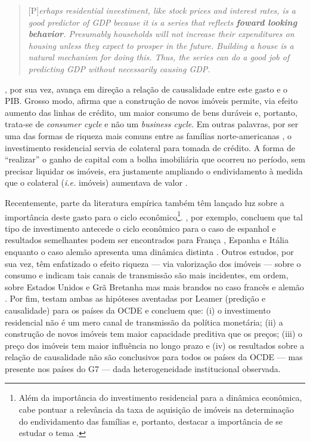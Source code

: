 \begin{quote}
	
	[P]\textit{erhaps residential investiment, like stock prices and interest rates, is a good predictor of GDP because it is a series that reflects \textbf{foward looking behavior}. Presumably households will not increase their expenditures on housing unless they expect to prosper in the future. Building a house is a natural mechanism for doing this. Thus, the series can do a good job of predicting GDP without necessarily causing GDP.}
	\cite[p.~267, grifos adicionados]{green_follow_1997}
\end{quote}
\textcite{leamer_housing_2007}, por sua vez, avança em direção a relação de causalidade entre este gasto e o PIB. Grosso modo, afirma que a construção de novos imóveis permite, via efeito aumento das linhas de crédito, um maior consumo de bens duráveis e, portanto, trata-se de \textit{consumer cycle} e não um \textit{business cycle}. Em outras palavras, por ser  uma das formas de riqueza mais comuns entre as famílias norte-americanas \cite{teixeira_uma_2011}, o investimento residencial servia de colateral para tomada de crédito. A forma de ``realizar'' o ganho de capital com a bolha imobiliária que ocorreu no período, sem precisar liquidar os imóveis, era justamente ampliando o endividamento à medida que o colateral (\textit{i.e.} imóveis) aumentava de valor \cite{teixeira_crescimento_2015}. 

Recentemente, parte da literatura empírica também têm lançado luz sobre a importância deste gasto para o ciclo econômico\footnote{Além da importância do investimento residencial para a dinâmica econômica, cabe pontuar a relevância da taxa de aquisição de imóveis na determinação do endividamento das famílias e, portanto, destacar a importância de se estudar o tema \cite{schwartz_politics_2009}.
}. \textcite{alvarez_does_2010}, por exemplo, concluem que tal tipo de investimento antecede o ciclo econômico para o caso de espanhol e resultados semelhantes podem ser encontrados para França \cite{ferrara_cyclical_2010}, Espanha  e Itália enquanto o caso alemão apresenta uma dinâmica distinta \cite{ferrara_common_2010}. 
Outros estudos, por sua vez, têm enfatizado o efeito riqueza --- via valorização dos imóveis --- sobre o consumo e indicam tais canais de transmissão são mais incidentes, em ordem, sobre Estados Unidos e Grã Bretanha mas mais brandos no caso francês e alemão \cites{sastre_assessment_2010}{chauvin_wealth_2010}{bassanetti_effects_2010}{arrondel_housing_2010}. Por fim, \textcite{huang_is_2018} testam ambas as hipóteses aventadas por Leamer  (predição e causalidade) para os países da OCDE e concluem que: (i) o investimento residencial não é um mero canal de transmissão da política monetária; (ii) a construção de novos imóveis tem maior capacidade preditiva que os preços; (iii) o preço dos imóveis tem maior influência no longo prazo e (iv) os resultados sobre a relação de causalidade não são conclusivos para todos os países da OCDE --- mas presente nos países do G7 --- dada heterogeneidade institucional observada.

